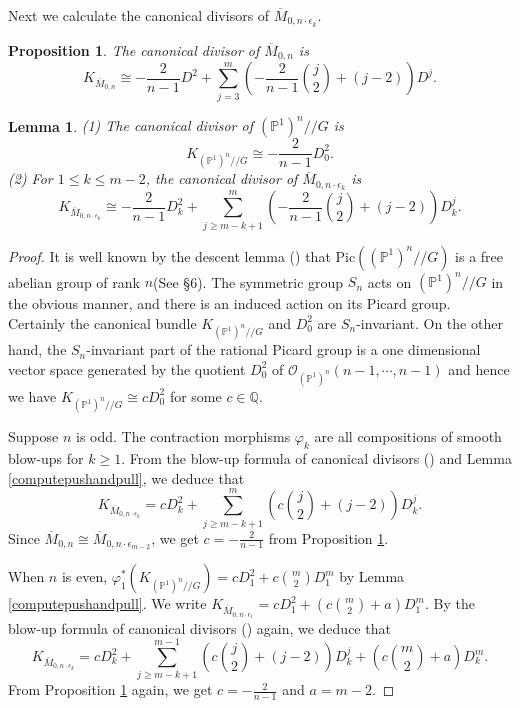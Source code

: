 \documentclass[10pt]{amsart}
\newtheorem{proposition}[theorem]{Proposition}
\newtheorem{lemma}[theorem]{Lemma}
\theoremstyle{definition}
\newcommand{\PP}{\mathbb{P}}
\newcommand{\QQ}{\mathbb{Q}}
\newcommand{\cO}{\mathcal{O} }
\def\Mzn{\overline{M}_{0,n} }
\def\Mzeo{\overline{M}_{0,n\cdot \epsilon_1} }
\def\Mzemt{\overline{M}_{0,n\cdot \epsilon_{m-2}} }
\def\Mzek{\overline{M}_{0,n\cdot \epsilon_k} }
\def\git{/\!/ }
\begin{document}
Next we calculate the canonical divisors of $\Mzek$.
\begin{proposition}\label{canonicaldiv1} \cite[Proposition
1]{Pand} The canonical divisor of $\Mzn$ is
\[
    K_{\Mzn} \cong -\frac{2}{n-1} D^2 + \sum_{j=3}^m
    \left(-\frac{2}{n-1}{j \choose 2} +(j-2)\right) D^j.
\]
\end{proposition}

\begin{lemma}\label{canonicaldiv2}
(1) The canonical divisor of $(\PP^1)^n \git G$ is
\[
    K_{(\PP^1)^n \git G} \cong -\frac{2}{n-1}D_0^2.
\]
(2) For $1\le k\le m-2$, the canonical divisor of $\Mzek$ is
\[
    K_{\Mzek} \cong -\frac{2}{n-1}D_k^2 + \sum_{j\ge m-k+1}^m
    \left(-\frac{2}{n-1}{j \choose 2} + (j-2) \right)D_k^j.
\]
\end{lemma}

\begin{proof}
It is well known by the descent lemma (\cite{DN}) that
$\mathrm{Pic}((\PP^1)^n \git G)$ is a free abelian group of rank
$n$(See \S6).  The symmetric group $S_n$ acts on $(\PP^1)^n \git G$ in the
obvious manner, and there is an induced action on its Picard
group. Certainly the canonical bundle $K_{(\PP^1)^n \git G}$ and
$D^2_0$ are $S_n$-invariant. On the other hand, the
$S_n$-invariant part of the rational Picard group is a one
dimensional vector space generated by the quotient $D_0^2$ of
$\cO_{(\PP^1)^n}(n-1,\cdots,n-1)$ and hence we have $K_{(\PP^1)^n
\git G} \cong c D_0^2$ for some $c\in \QQ$.

Suppose $n$ is odd. The contraction morphisms $\varphi_k$ are all
compositions of smooth blow-ups for $k \ge 1$. From the blow-up
formula of canonical divisors (\cite[II Exe. 8.5]{Hartshorne}) and
Lemma \ref{computepushandpull}, we deduce that
\[
    K_{\Mzek} = cD^2_k + \sum_{j\ge m-k+1}^m
    \left(c{j \choose 2} + (j-2)\right)D^j_k.
\]
Since $\Mzn \cong \Mzemt$, we get $c = -\frac{2}{n-1}$ from
Proposition \ref{canonicaldiv1}.

When $n$ is even, $\varphi_1^*(K_{(\PP^1)^n \git G}) = cD_1^2 +
c{m \choose 2} D^m_1$ by Lemma \ref{computepushandpull}. We write
$K_{\Mzeo} = cD_1^2 + (c{m \choose 2} + a)D_1^m$. By the blow-up
formula of canonical divisors (\cite[II Exe. 8.5]{Hartshorne})
again, we deduce that
\[
    K_{\Mzek} = cD_k^2 + \sum_{j \ge m-k+1}^{m-1}
    \left( c{j \choose 2} + (j-2)\right)D_k^j + (c{m \choose 2} + a)D_k^m.
\]
From Proposition \ref{canonicaldiv1} again, we get $c =
-\frac{2}{n-1}$ and $a = m-2$.
\end{proof}
\end{document}

